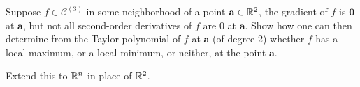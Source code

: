 \begin{myExercise}
    \label{ex:9.29}
\end{myExercise}


\begin{myExercise}
    \label{ex:9.30}
\end{myExercise}


\begin{myExercise}
    \label{ex:9.31}
    Suppose $f \in \mathscr{C}^{(3)}$ in some neighborhood of a point $\mathbf{a} \in {\protect\mathbb R}^2$, the gradient of $f$ is $\mathbf{0}$ at $\mathbf{a}$, but not all second-order derivatives of $f$ are 0 at $\mathbf{a}$. 
    Show how one can then determine from the Taylor polynomial of $f$ at $\mathbf{a}$ (of degree 2) whether $f$ has a local maximum, or a local minimum, or neither, at the point $\mathbf{a}$. 
    
    Extend this to ${\protect\mathbb R}^n$ in place of ${\protect\mathbb R}^2$.
\end{myExercise}